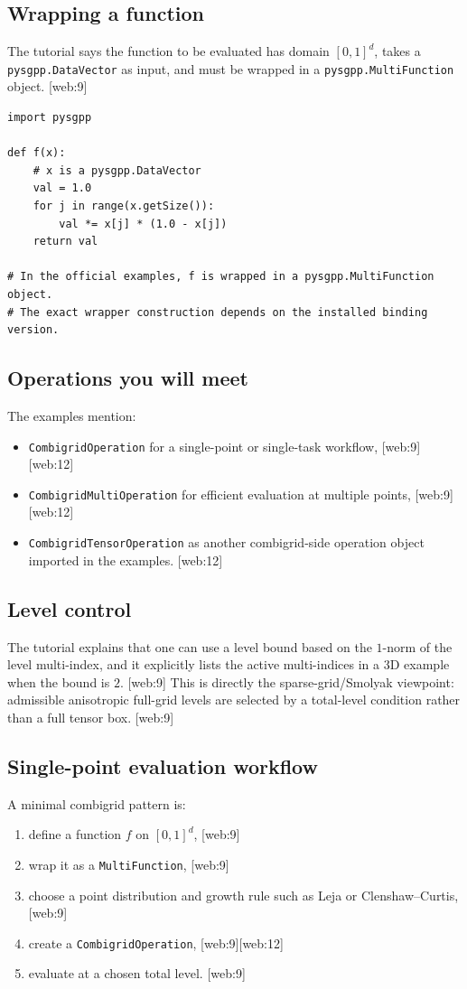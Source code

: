 \documentclass[11pt,a4paper]{article}
\begin{document}
\subsection{Wrapping a function}
The tutorial says the function to be evaluated has domain \([0,1]^d\), takes a \texttt{pysgpp.DataVector} as input, and must be wrapped in a \texttt{pysgpp.MultiFunction} object. [web:9]  

\begin{lstlisting}[style=py]
import pysgpp

def f(x):
    # x is a pysgpp.DataVector
    val = 1.0
    for j in range(x.getSize()):
        val *= x[j] * (1.0 - x[j])
    return val

# In the official examples, f is wrapped in a pysgpp.MultiFunction object.
# The exact wrapper construction depends on the installed binding version.
\end{lstlisting}

\subsection{Operations you will meet}
The examples mention:
\begin{itemize}[leftmargin=1.5em]
\item \texttt{CombigridOperation} for a single-point or single-task workflow, [web:9][web:12]
\item \texttt{CombigridMultiOperation} for efficient evaluation at multiple points, [web:9][web:12]
\item \texttt{CombigridTensorOperation} as another combigrid-side operation object imported in the examples. [web:12]
\end{itemize}

\subsection{Level control}
The tutorial explains that one can use a level bound based on the \(1\)-norm of the level multi-index, and it explicitly lists the active multi-indices in a 3D example when the bound is \(2\). [web:9]  
This is directly the sparse-grid/Smolyak viewpoint: admissible anisotropic full-grid levels are selected by a total-level condition rather than a full tensor box. [web:9]  

\subsection{Single-point evaluation workflow}
A minimal combigrid pattern is:
\begin{enumerate}[leftmargin=1.5em]
\item define a function \(f\) on \([0,1]^d\), [web:9]
\item wrap it as a \texttt{MultiFunction}, [web:9]
\item choose a point distribution and growth rule such as Leja or Clenshaw--Curtis, [web:9]
\item create a \texttt{CombigridOperation}, [web:9][web:12]
\item evaluate at a chosen total level. [web:9]
\end{enumerate}
\end{document}
